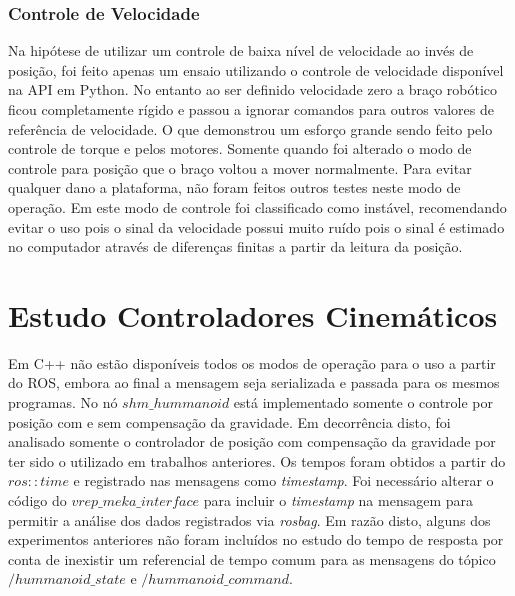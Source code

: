 \subsubsection{Controle de Velocidade}

Na hipótese de utilizar um controle de baixa nível de velocidade ao invés de posição, foi feito apenas um ensaio utilizando o controle de velocidade disponível na API em Python. No entanto ao ser definido velocidade zero a braço robótico ficou completamente rígido e passou a ignorar comandos para outros valores de referência de velocidade. O que demonstrou um esforço grande sendo feito pelo controle de torque e pelos motores. Somente quando foi alterado o modo de controle para posição que o braço voltou a mover normalmente. Para evitar qualquer dano a plataforma, não foram feitos outros testes neste modo de operação. Em \cite{mekartfd} este modo de controle foi classificado como instável, recomendando evitar o uso pois o sinal da velocidade possui muito ruído pois o sinal é estimado no computador através de diferenças finitas a partir da leitura da posição.





\section{Estudo Controladores Cinemáticos}

Em C++ não estão disponíveis todos os modos de operação para o uso a partir do ROS, embora ao final a mensagem seja serializada e passada para os mesmos programas. No nó $shm\_hummanoid$ está implementado somente o controle por posição com e sem compensação da gravidade. Em decorrência disto, foi analisado somente o controlador de posição com compensação da gravidade por ter sido o utilizado em trabalhos anteriores. Os tempos foram obtidos a partir do $ros::time$ e registrado nas mensagens como \textit{timestamp}. Foi necessário alterar o código do $vrep\_meka\_interface$ para incluir o \textit{timestamp} na mensagem para permitir a análise dos dados registrados via \textit{rosbag}. Em razão disto, alguns dos experimentos anteriores não foram incluídos no estudo do tempo de resposta por conta de inexistir um referencial de tempo comum para as mensagens do tópico $/hummanoid\_state$ e $/hummanoid\_command$.

